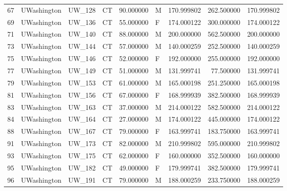 \begin{tabular}{llllrlrrr}
67     &     UWashington &       UW\_128 &                 CT &  90.000000 &        M &       170.999802 &    262.500000 &  170.999802 \\
69     &     UWashington &       UW\_136 &                 CT &  55.000000 &        F &       174.000122 &    300.000000 &  174.000122 \\
71     &     UWashington &       UW\_140 &                 CT &  88.000000 &        M &       200.000000 &    562.500000 &  200.000000 \\
73     &     UWashington &       UW\_144 &                 CT &  57.000000 &        M &       140.000259 &    252.500000 &  140.000259 \\
75     &     UWashington &       UW\_146 &                 CT &  52.000000 &        F &       192.000000 &    255.000000 &  192.000000 \\
77     &     UWashington &       UW\_149 &                 CT &  51.000000 &        M &       131.999741 &     77.500000 &  131.999741 \\
79     &     UWashington &       UW\_153 &                 CT &  61.000000 &        M &       165.000198 &    251.250000 &  165.000198 \\
81     &     UWashington &       UW\_156 &                 CT &  67.000000 &        F &       168.999939 &    382.500000 &  168.999939 \\
83     &     UWashington &       UW\_163 &                 CT &  37.000000 &        M &       214.000122 &    582.500000 &  214.000122 \\
84     &     UWashington &       UW\_164 &                 CT &  27.000000 &        M &       174.000122 &    445.000000 &  174.000122 \\
88     &     UWashington &       UW\_167 &                 CT &  79.000000 &        F &       163.999741 &    183.750000 &  163.999741 \\
91     &     UWashington &       UW\_173 &                 CT &  82.000000 &        M &       210.999802 &    595.000000 &  210.999802 \\
93     &     UWashington &       UW\_175 &                 CT &  62.000000 &        F &       160.000000 &    352.500000 &  160.000000 \\
95     &     UWashington &       UW\_182 &                 CT &  49.000000 &        F &       179.999741 &    382.500000 &  179.999741 \\
96     &     UWashington &       UW\_191 &                 CT &  79.000000 &        M &       188.000259 &    233.750000 &  188.000259 \\

\end{tabular}
